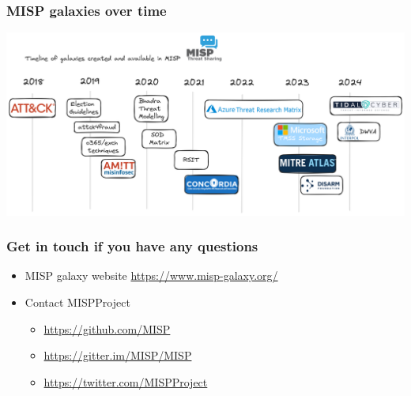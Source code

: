 
\begin{frame}
\titlepage
\end{frame}

\begin{frame}
	\frametitle{MISP galaxies over time}
	\begin{center}
	\includegraphics[scale=0.13]{./screenshots/timeline.png}
	\end{center}
\end{frame}


\begin{frame}
  \frametitle{Get in touch if you have any questions}
  \begin{itemize}
    \item MISP galaxy website \url{https://www.misp-galaxy.org/}
    \item Contact MISPProject 
    \begin{itemize}
      \item \url{https://github.com/MISP}
      \item \url{https://gitter.im/MISP/MISP}
      \item \url{https://twitter.com/MISPProject}
    \end{itemize}
  \end{itemize}
\end{frame}
